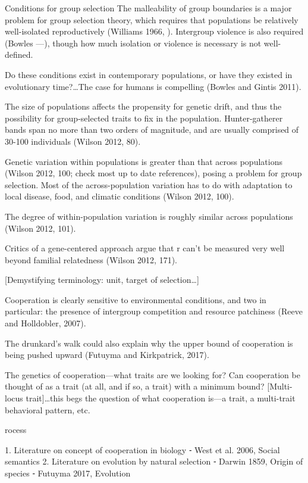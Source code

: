 \documentclass{tufte-book} %
\begin{document}
Conditions for group selection
The malleability of group boundaries is a major problem for group selection theory, which requires that populations be relatively well-isolated reproductively (Williams 1966, ). Intergroup violence is also required (Bowles —), though how much isolation or violence is necessary is not well-defined. 

Do these conditions exist in contemporary populations, or have they existed in evolutionary time?…The case for humans is compelling (Bowles and Gintis 2011). 

The size of populations affects the propensity for genetic drift, and thus the possibility for group-selected traits to fix in the population. Hunter-gatherer bands span no more than two orders of magnitude, and are usually comprised of 30-100 individuals (Wilson 2012, 80). 

Genetic variation within populations is greater than that across populations (Wilson 2012, 100; check most up to date references), posing a problem for group selection. Most of the across-population variation has to do with adaptation to local disease, food, and climatic conditions (Wilson 2012, 100). 

The degree of within-population variation is roughly similar across populations (Wilson 2012, 101). 

Critics of a gene-centered approach argue that r can’t be measured very well beyond familial relatedness (Wilson 2012, 171). 

[Demystifying terminology: unit, target of selection…]









Cooperation is clearly sensitive to environmental conditions, and two in particular: the presence of intergroup competition and resource patchiness (Reeve and Holldobler, 2007). 

The drunkard’s walk could also explain why the upper bound of cooperation is being pushed upward (Futuyma and Kirkpatrick, 2017). 

The genetics of cooperation—what traits are we looking for?
Can cooperation be thought of as a trait (at all, and if so, a trait) with a minimum bound? [Multi-locus trait]…this begs the question of what cooperation is—a trait, a multi-trait behavioral pattern, etc.

rocess

	1.	Literature on concept of cooperation in biology
	⁃	West et al. 2006, Social semantics
	2.	Literature on evolution by natural selection
	⁃	Darwin 1859, Origin of species
	⁃	Futuyma 2017, Evolution
\end{document}
